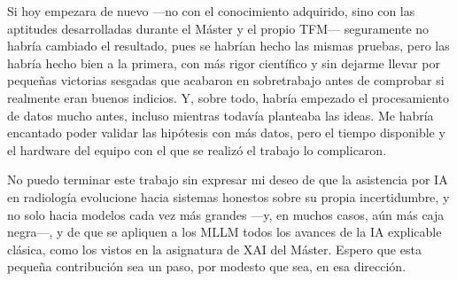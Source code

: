 Si hoy empezara de nuevo —no con el conocimiento adquirido, sino con las aptitudes desarrolladas
durante el Máster y el propio TFM— seguramente no habría cambiado el resultado, pues se habrían hecho
las mismas pruebas, pero las habría hecho bien a la primera, con más rigor científico y sin dejarme
llevar por pequeñas victorias sesgadas que acabaron en sobretrabajo antes de comprobar si realmente
eran buenos indicios. Y, sobre todo, habría empezado el procesamiento de datos mucho antes, incluso
mientras todavía planteaba las ideas. Me habría encantado poder validar las hipótesis con más datos,
pero el tiempo disponible y el hardware del equipo con el que se realizó el trabajo lo complicaron.

No puedo terminar este trabajo sin expresar mi deseo de que la asistencia por IA en radiología
evolucione hacia sistemas honestos sobre su propia incertidumbre, y no solo hacia modelos cada vez más
grandes —y, en muchos casos, aún más caja negra—, y de que se apliquen a los MLLM todos los avances de
la IA explicable clásica, como los vistos en la asignatura de XAI del Máster. Espero que esta pequeña
contribución sea un paso, por modesto que sea, en esa dirección.
